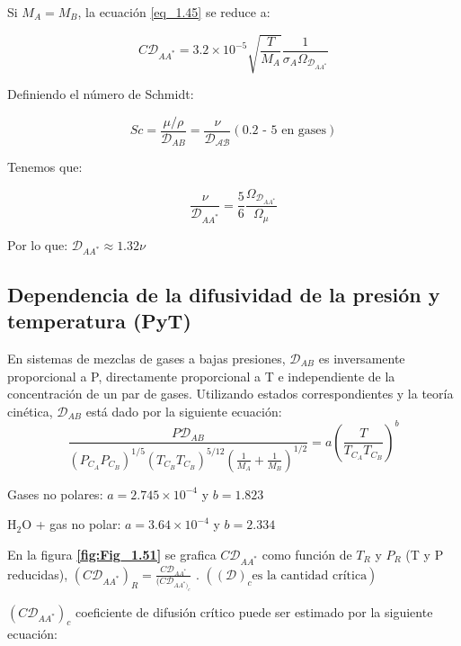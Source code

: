 Si \( M_A = M_B \), la ecuación \eqref{eq_1.45} se reduce a:

\begin{equation}
C\mathscr{D}_{AA^*} = 3.2 \times 10^{-5}\sqrt{\frac{T}{M_A}} \frac{1}{\sigma_A \Omega_{\mathscr{D}_{AA^*}}} \tag{1.50}\label{eq_1.50}
\end{equation}

Definiendo el número de Schmidt:

\begin{equation}
Sc = \frac{\mu / \rho}{\mathscr{D}_{AB}} = \frac{\nu}{\mathscr{D_{AB}}} (\text{0.2 - 5 en gases}) \tag{1.51}\label{eq_1.51}
\end{equation}

Tenemos que:

\begin{equation}
\frac{\nu}{\mathscr{D}_{AA^*}} = \frac{5}{6}\frac{\Omega_{\mathscr{D}_{AA^*}}}{ \Omega_\mu}\tag{1.52}\label{eq_1.52}
\end{equation}

Por lo que: $\mathscr{D}_{AA^*} \approx 1.32 \nu$
\subsection{Dependencia de la difusividad de la presión y temperatura (PyT)}
En sistemas de mezclas de gases a bajas presiones,  $\mathscr{D}_{AB}$ es inversamente proporcional a P, directamente proporcional a T e independiente de la concentración de un par de gases.
Utilizando estados correspondientes y la teoría cinética, \( \mathscr{D}_{AB} \) está dado por la siguiente ecuación:
\setcounter{figure}{50}
\begin{equation}
\frac{P \mathscr{D}_{AB}}{(P_{C_A} P_{C_{B}})^{1/5} (T_{{C_B}} T_{C_{B}})^{5/12} \left( \frac{1}{M_A} + \frac{1}{M_B} \right)^{1/2}} = a \left( \frac{T}{T_{C_A} T_{C_B}} \right)^b\tag{1.53}\label{eq_1.53}
\end{equation}

Gases no polares: \( a = 2.745 \times 10^{-4} \) y \( b = 1.823 \)  

H$_2$O + gas no polar: \( a = 3.64 \times 10^{-4} \) y \( b = 2.334 \)

En la figura \textbf{\eqref{fig:Fig_1.51}} se grafica \( C \mathscr{D}_{AA^*}\) como función de \( T_R \) y \( P_R \) (T y P reducidas), \( (C \mathscr{D}_{AA^*})_R=\frac{C\mathscr{D}_{AA^*}}{(C\mathscr{D}_{AA^*)_c}} \) .
$((\mathscr{D})_c \text{es la cantidad crítica})$

$(C\mathscr{D}_{AA^*})_c$ coeficiente de difusión crítico puede ser estimado por la siguiente ecuación:

